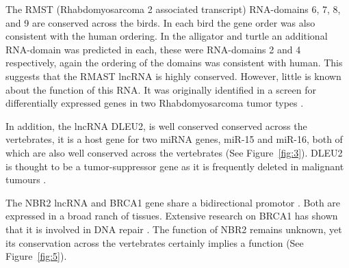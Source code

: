 \documentclass[10pt]{bmc_article}
\newenvironment{bmcformat}{\begin{raggedright}\baselineskip20pt\sloppy\setboolean{publ}{false}}{\end{raggedright}\baselineskip20pt\sloppy}
\begin{document}
\begin{bmcformat}
The RMST (Rhabdomyosarcoma 2 associated transcript) RNA-domains 6, 7,
8, and 9 are conserved across the birds. In each bird the gene order
was also consistent with the human ordering. In the alligator and
turtle an additional RNA-domain was predicted in each, these were
RNA-domains 2 and 4 respectively, again the ordering of the domains
was consistent with human. This suggests that the RMAST lncRNA is
highly conserved. However, little is known about the function of this
RNA. It was originally identified in a screen for differentially
expressed genes in two Rhabdomyosarcoma tumor types \cite{Chan:2002}.

In addition, the lncRNA DLEU2, is well conserved conserved across the
vertebrates, it is a host gene for two miRNA genes, miR-15 and miR-16,
both of which are also well conserved across the vertebrates (See
Figure~\ref{fig:3}). DLEU2 is thought to be a tumor-suppressor
gene as it is frequently deleted in malignant tumours \cite{Lerner:2009,Klein:2010}.


The NBR2 lncRNA and BRCA1 gene share a bidirectional promotor
\cite{Xu:1997}. Both are expressed in a broad ranch of tissues. Extensive
research on BRCA1 has shown that it is involved in DNA repair
\cite{}. The function of NBR2 remains unknown, yet its conservation
across the vertebrates certainly implies a function (See
Figure~\ref{fig:5}).






\end{bmcformat}
\end{document}
